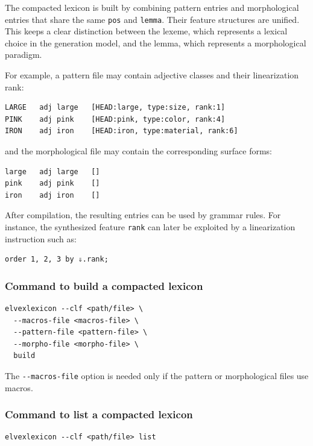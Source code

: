 \documentclass[11pt]{article}
\begin{document}
The compacted lexicon is built by combining pattern entries and morphological
entries that share the same \verb#pos# and \verb#lemma#. Their feature
structures are unified. This keeps a clear distinction between the lexeme,
which represents a lexical choice in the generation model, and the lemma,
which represents a morphological paradigm.

For example, a pattern file may contain adjective classes and their
linearization rank:

\begin{lstlisting}[frame=none, numbers=none]
LARGE	adj	large	[HEAD:large, type:size, rank:1]
PINK	adj	pink	[HEAD:pink, type:color, rank:4]
IRON	adj	iron	[HEAD:iron, type:material, rank:6]
\end{lstlisting}

and the morphological file may contain the corresponding surface forms:

\begin{lstlisting}[frame=none, numbers=none]
large	adj	large	[]
pink	adj	pink	[]
iron	adj	iron	[]
\end{lstlisting}

After compilation, the resulting entries can be used by grammar rules. For
instance, the synthesized feature \verb#rank# can later be exploited by a
linearization instruction such as:

\begin{lstlisting}[frame=none, numbers=none]
order 1, 2, 3 by ⇓.rank;
\end{lstlisting}

\subsubsection*{Command to build a compacted lexicon}

\begin{lstlisting}[frame=none, numbers=none]
elvexlexicon --clf <path/file> \
  --macros-file <macros-file> \
  --pattern-file <pattern-file> \
  --morpho-file <morpho-file> \
  build
\end{lstlisting}

The \verb#--macros-file# option is needed only if the pattern or
morphological files use macros.

\subsubsection*{Command to list a compacted lexicon}

\begin{lstlisting}[frame=none, numbers=none]
elvexlexicon --clf <path/file> list
\end{lstlisting}
\end{document}
